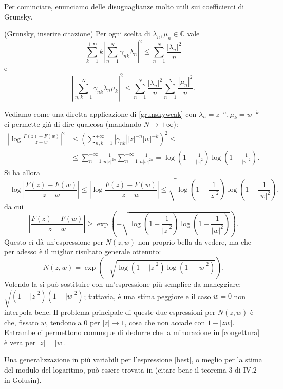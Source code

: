 Per cominciare, enunciamo delle disuguaglianze molto utili sui coefficienti di Grunsky.
\begin{thm}
  (Grunsky, inserire citazione) Per ogni scelta di $\lambda_n, \mu_n \in \mathbb{C}$ vale
  \begin{equation}\label{grunskystrong}
    \sum_{k=1}^{+\infty} k\left|\sum_{n=1}^N\gamma_{nk}\lambda_n\right|^2 \le \sum_{n=1}^N \frac{|\lambda_n|^2}{n}
  \end{equation}
  e
  \begin{equation}\label{grunskyweak}
    \left|\sum_{n,k=1}^N \gamma_{nk}\lambda_n\mu_k\right|^2 \le \sum_{n=1}^N \frac{|\lambda_n|^2}{n}\sum_{n=1}^N \frac{|\mu_n|^2}{n}.
  \end{equation}
\end{thm}
Vediamo come una diretta applicazione di \eqref{grunskyweak} con $\lambda_n=z^{-n},\mu_k=w^{-k}$ ci permette già di dire qualcosa (mandando $N \longrightarrow +\infty$):
\begin{align*}
  \left|\log{\frac{F(z)-F(w)}{z-w}}\right|^2 &\le \left(\sum_{n,k=1}^{+\infty} |\gamma_{nk}||z|^{-n}|w|^{-k}\right)^2 \le \\
  &\le \sum_{n=1}^{+\infty} \frac{1}{n|z|^{2n}}\sum_{n=1}^{+\infty} \frac{1}{n|w|^{2n}}=\log\left(1-\frac{1}{|z|^2}\right)\log\left(1-\frac{1}{|w|^2}\right).
\end{align*}
Si ha allora
$$-\log{\left|\frac{F(z)-F(w)}{z-w}\right|} \le \left|\log{\frac{F(z)-F(w)}{z-w}}\right| \le \sqrt{\log\left(1-\frac{1}{|z|^2}\right)\log\left(1-\frac{1}{|w|^2}\right)},$$
da cui
$$\left|\frac{F(z)-F(w)}{z-w}\right| \ge \exp\left(-\sqrt{\log\left(1-\frac{1}{|z|^2}\right)\log\left(1-\frac{1}{|w|^2}\right)}\right).$$
Questo ci dà un'espressione per $N(z,w)$ non proprio bella da vedere, ma che per adesso è il miglior risultato generale ottenuto:
\begin{equation} \label{best}
  N(z,w)=\exp\left(-\sqrt{\log\left(1-|z|^2\right)\log\left(1-|w|^2\right)}\right).
\end{equation}
Volendo la si può sostituire con un'espressione più semplice da maneggiare: $\sqrt{(1-|z|^2)(1-|w|^2)}$; tuttavia, è una stima peggiore e il caso $w=0$ non interpola bene. Il problema principale di queste due espressioni per $N(z,w)$ è che, fissato $w$, tendono a $0$ per $|z| \longrightarrow 1$, cosa che non accade con $1-|zw|$. Entrambe ci permettono comunque di dedurre che la minorazione in \eqref{congettura} è vera per $|z|=|w|$.

Una generalizzazione in più variabili per l'espressione \eqref{best}, o meglio per la stima del modulo del logaritmo, può essere trovata in (citare bene il teorema 3 di IV.2 in Golusin). \\

